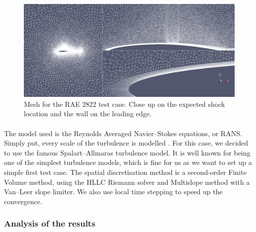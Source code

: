         \begin{figure}
          \centering
          \includegraphics[width=\textwidth]{figures/rae_mesh.png}
          \caption{Mesh for the RAE 2822 test case. Close up on the expected shock location and the wall on the leading edge.}
          \label{fig:rae_mesh}
        \end{figure}

        \paragraph{}
        The model used is the Reynolds Averaged Navier--Stokes equations, or RANS.
        Simply put, every scale of the turbulence is modelled .
        For this case, we decided to use the famous Spalart--Allmaras turbulence model.
        It is well known for being one of the simplest turbulence models, which is fine for us as we want to set up a simple first test case.
        The spatial discretisation method is a second-order Finite Volume method, using the HLLC Riemann solver and Multislope method with a Van--Leer slope limiter.
        We also use local time stepping to speed up the convergence.


      \subsubsection{Analysis of the results}




